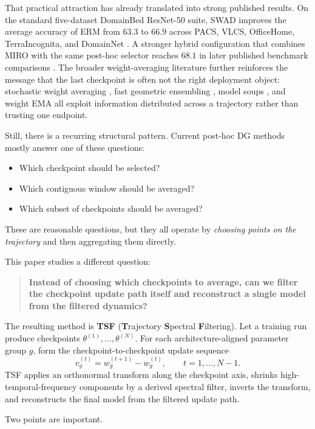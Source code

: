 \documentclass{article}
\newcommand{\tsf}{\textup{\textsc{TSF}}}
\newcommand{\swad}{\textup{\textsc{SWAD}}}
\newcommand{\miro}{\textup{\textsc{MIRO}}}
\newcommand{\erm}{\textup{\textsc{ERM}}}
\begin{document}
That practical attraction has already translated into strong published results. On the standard five-dataset DomainBed ResNet-50 suite, \swad{} improves the average accuracy of \erm{} from \(63.3\) to \(66.9\) across PACS, VLCS, OfficeHome, TerraIncognita, and DomainNet \citep{cha2021swad}. A stronger hybrid configuration that combines \miro{} with the same post-hoc selector reaches \(68.1\) in later published benchmark comparisons \citep{teterwak2025ermpp}. The broader weight-averaging literature further reinforces the message that the last checkpoint is often not the right deployment object: stochastic weight averaging \citep{izmailov2018swa}, fast geometric ensembling \citep{garipov2018fge}, model soups \citep{wortsman2022soups}, and weight EMA \citep{moralesbrotons2024ema} all exploit information distributed across a trajectory rather than trusting one endpoint.

Still, there is a recurring structural pattern. Current post-hoc DG methods mostly answer one of these questions:
\begin{itemize}[leftmargin=1.4em]
    \item Which checkpoint should be selected?
    \item Which contiguous window should be averaged?
    \item Which subset of checkpoints should be averaged?
\end{itemize}
These are reasonable questions, but they all operate by \emph{choosing points on the trajectory} and then aggregating them directly.

This paper studies a different question:
\begin{quote}
\textbf{Instead of choosing which checkpoints to average, can we filter the checkpoint update path itself and reconstruct a single model from the filtered dynamics?}
\end{quote}

The resulting method is \textbf{\tsf{}} (\textbf{T}rajectory \textbf{S}pectral \textbf{F}iltering). Let a training run produce checkpoints \(\theta^{(1)},\ldots,\theta^{(N)}\). For each architecture-aligned parameter group \(g\), form the checkpoint-to-checkpoint update sequence
\[
v_g^{(t)} = w_g^{(t+1)} - w_g^{(t)}, \qquad t=1,\ldots,N-1.
\]
\tsf{} applies an orthonormal transform along the checkpoint axis, shrinks high-temporal-frequency components by a derived spectral filter, inverts the transform, and reconstructs the final model from the filtered update path.

Two points are important.
\end{document}
